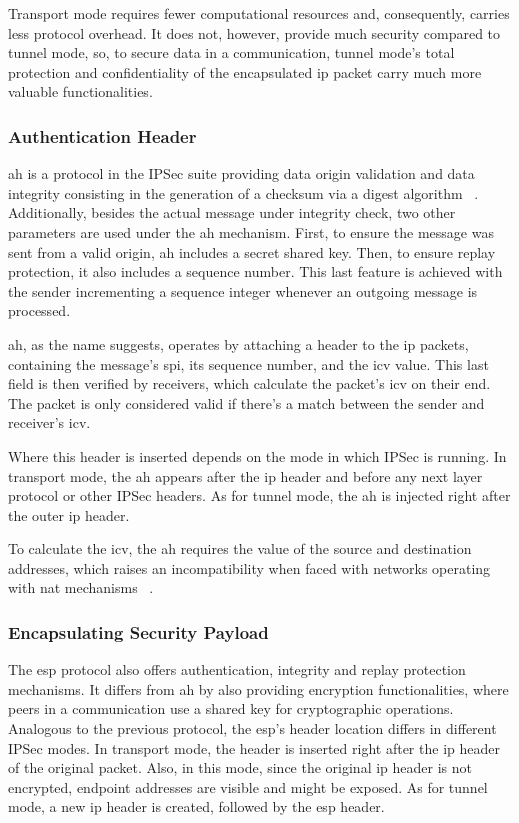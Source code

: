 \documentclass[11pt,twoside,a4paper]{report}
\begin{document}
Transport mode requires fewer computational resources and, consequently, carries less protocol overhead. It does not, however, provide much security compared to tunnel mode, so, to secure data in a communication, tunnel mode's total protection and confidentiality of the encapsulated \ac{ip} packet carry much more valuable functionalities.

\subsubsection{Authentication Header}

\ac{ah} is a protocol in the IPSec suite providing data origin validation and data integrity consisting in the generation of a checksum via a digest algorithm ~\cite{rfc4302}. Additionally, besides the actual message under integrity check, two other parameters are used under the \ac{ah} mechanism. First, to ensure the message was sent from a valid origin, \ac{ah} includes a secret shared key. Then, to ensure replay protection, it also includes a sequence number. This last feature is achieved with the sender incrementing a sequence integer whenever an outgoing message is processed.

\ac{ah}, as the name suggests, operates by attaching a header to the \ac{ip} packets, containing the message's \ac{spi}, its sequence number, and the \ac{icv} value. This last field is then verified by receivers, which calculate the packet's \ac{icv} on their end. The packet is only considered valid if there's a match between the sender and receiver's \ac{icv}.

Where this header is inserted depends on the mode in which IPSec is running. In transport mode, the \ac{ah} appears after the \ac{ip} header and before any next layer protocol or other IPSec headers. As for tunnel mode, the \ac{ah} is injected right after the outer \ac{ip} header.

To calculate the \ac{icv}, the \ac{ah} requires the value of the source and destination addresses, which raises an incompatibility when faced with networks operating with \ac{nat} mechanisms ~\cite{frankel2005guide}.

\subsubsection{Encapsulating Security Payload}

The \ac{esp} protocol also offers authentication, integrity and replay protection mechanisms. It differs from \ac{ah} by also providing encryption functionalities, where peers in a communication use a shared key for cryptographic operations. Analogous to the previous protocol, the \ac{esp}'s header location differs in different IPSec modes. In transport mode, the header is inserted right after the \ac{ip} header of the original packet. Also, in this mode, since the original \ac{ip} header is not encrypted, endpoint addresses are visible and might be exposed. As for tunnel mode, a new \ac{ip} header is created, followed by the \ac{esp} header.
\end{document}
